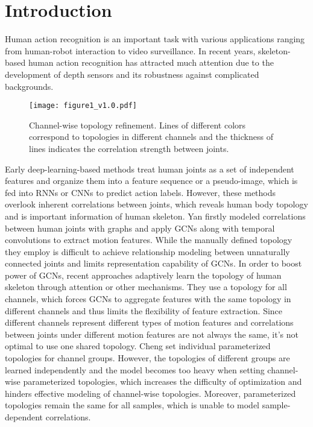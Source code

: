 \documentclass[10pt,twocolumn,letterpaper]{article}
\begin{document}
\section{Introduction}

Human action recognition is an important task with various applications ranging from human-robot interaction to video surveillance. In recent years, skeleton-based human action recognition has attracted much attention due to the development of depth sensors and its robustness against complicated backgrounds.

\begin{figure}[t]
	\centering
	\texttt{[image: figure1\_v1.0.pdf]} \caption{Channel-wise topology refinement. Lines of different colors correspond to topologies in different channels and the thickness of lines indicates the correlation strength between joints.}
	\label{fig:adaptive_correlation}
	\vspace{-0.4cm}
\end{figure}

Early deep-learning-based methods treat human joints as a set of independent features and organize them into a  feature sequence or a pseudo-image, which is fed into RNNs or CNNs to predict action labels. However, these methods overlook inherent correlations between joints, which reveals human body topology and is important information of human skeleton. Yan \etal \cite{yan2018spatial} firstly modeled correlations between human joints with graphs and apply GCNs along with temporal convolutions to extract motion features. While the manually defined topology they employ is difficult to achieve relationship modeling between unnaturally connected joints and limits representation capability of GCNs. In order to boost power of GCNs, recent approaches \cite{shi2019two,zhang2020semantics,ye2020dynamic} adaptively learn the topology of human skeleton through attention or other mechanisms. They use a topology for all channels, which forces GCNs to aggregate features with the same topology in different channels and thus limits the flexibility of feature extraction. Since different channels represent different types of motion features and correlations between joints under different motion features are not always the same, it's not optimal to use one shared topology. Cheng \etal \cite{cheng2020eccv} set individual parameterized topologies for channel groups. 
However, the topologies of different groups are learned independently and the model becomes too heavy when setting channel-wise parameterized topologies, which increases the difficulty of optimization and hinders effective modeling of channel-wise topologies. Moreover, parameterized topologies remain the same for all samples, which is unable to model sample-dependent correlations.
\end{document}
